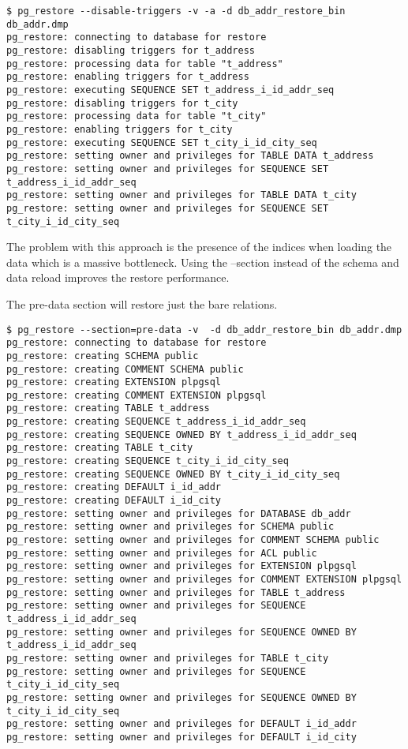 \begin{verbatim}
$ pg_restore --disable-triggers -v -a -d db_addr_restore_bin db_addr.dmp
pg_restore: connecting to database for restore
pg_restore: disabling triggers for t_address
pg_restore: processing data for table "t_address"
pg_restore: enabling triggers for t_address
pg_restore: executing SEQUENCE SET t_address_i_id_addr_seq
pg_restore: disabling triggers for t_city
pg_restore: processing data for table "t_city"
pg_restore: enabling triggers for t_city
pg_restore: executing SEQUENCE SET t_city_i_id_city_seq
pg_restore: setting owner and privileges for TABLE DATA t_address
pg_restore: setting owner and privileges for SEQUENCE SET t_address_i_id_addr_seq
pg_restore: setting owner and privileges for TABLE DATA t_city
pg_restore: setting owner and privileges for SEQUENCE SET t_city_i_id_city_seq

\end{verbatim}

The problem with this approach is the presence of the indices when loading the data which is a massive
bottleneck. Using the --section instead of the schema and data reload improves the restore
performance.\newline

The pre-data section will restore just the bare relations.
\begin{verbatim}
$ pg_restore --section=pre-data -v  -d db_addr_restore_bin db_addr.dmp
pg_restore: connecting to database for restore
pg_restore: creating SCHEMA public
pg_restore: creating COMMENT SCHEMA public
pg_restore: creating EXTENSION plpgsql
pg_restore: creating COMMENT EXTENSION plpgsql
pg_restore: creating TABLE t_address
pg_restore: creating SEQUENCE t_address_i_id_addr_seq
pg_restore: creating SEQUENCE OWNED BY t_address_i_id_addr_seq
pg_restore: creating TABLE t_city
pg_restore: creating SEQUENCE t_city_i_id_city_seq
pg_restore: creating SEQUENCE OWNED BY t_city_i_id_city_seq
pg_restore: creating DEFAULT i_id_addr
pg_restore: creating DEFAULT i_id_city
pg_restore: setting owner and privileges for DATABASE db_addr
pg_restore: setting owner and privileges for SCHEMA public
pg_restore: setting owner and privileges for COMMENT SCHEMA public
pg_restore: setting owner and privileges for ACL public
pg_restore: setting owner and privileges for EXTENSION plpgsql
pg_restore: setting owner and privileges for COMMENT EXTENSION plpgsql
pg_restore: setting owner and privileges for TABLE t_address
pg_restore: setting owner and privileges for SEQUENCE t_address_i_id_addr_seq
pg_restore: setting owner and privileges for SEQUENCE OWNED BY t_address_i_id_addr_seq
pg_restore: setting owner and privileges for TABLE t_city
pg_restore: setting owner and privileges for SEQUENCE t_city_i_id_city_seq
pg_restore: setting owner and privileges for SEQUENCE OWNED BY t_city_i_id_city_seq
pg_restore: setting owner and privileges for DEFAULT i_id_addr
pg_restore: setting owner and privileges for DEFAULT i_id_city

\end{verbatim}

